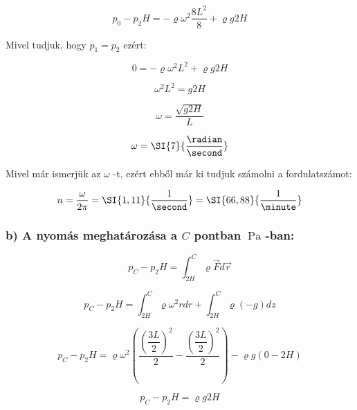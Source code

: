 \begin{equation}
p_0 - p_2H = -\varrho\omega^2 \dfrac{8L^2}{8} + \varrho g 2H
\end{equation}

Mivel tudjuk, hogy $p_1 = p_2$ ezért:

\begin{equation}
0 = -\varrho\omega^2 L^2 + \varrho g 2H
\end{equation}

\begin{equation}
\omega^2 L^2 = g 2H
\end{equation}

\begin{equation}
\omega = \dfrac{\sqrt{g 2H}}{L}
\end{equation}

\begin{equation}
\omega = \SI{7}{\dfrac{\radian}{\second}}
\end{equation}

Mivel már ismerjük az ${\omega}$ -t, ezért ebből már ki tudjuk számolni a fordulatszámot:

\begin{equation}
n = \dfrac{\omega}{2 \pi} = \SI{1,11}{\dfrac{1}{\second}} = \SI{66,88}{\dfrac{1}{\minute}}
\end{equation}

\subsubsection* {b) A nyomás meghatározása a $C$ pontban $\SI{}{\pascal}$ -ban:}

\begin{equation}
p_C - p_2H = \int_{2H}^{C} \varrho\vec{F} d\vec{r}
\end{equation}

\begin{equation}
p_C - p_2H = \int_{2H}^{C} \varrho\omega^2 r dr + \int_{2H}^{C} \varrho \left(-g\right) dz
\end{equation}

\begin{equation}
p_C - p_2H = \varrho\omega^2 \left(\dfrac{\left(\dfrac{3L}{2}\right)^2}{2} - \dfrac{\left(\dfrac{3L}{2}\right)^2}{2}\right) - \varrho g\left(0 - 2H\right)
\end{equation}

\begin{equation}
p_C - p_2H = \varrho g 2 H
\end{equation}

